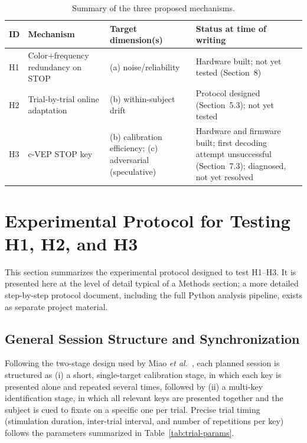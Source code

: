 \documentclass[11pt]{article}
\begin{document}
\begin{table}[htbp]
\centering
\caption{Summary of the three proposed mechanisms.}
\label{tab:h123-summary}
\small
\begin{tabular}{@{}p{1.0cm} p{4.5cm} p{2.6cm} p{4.1cm}@{}}
\toprule
\textbf{ID} & \textbf{Mechanism} & \textbf{Target dimension(s)} & \textbf{Status at time of writing} \\
\midrule
H1 & Color+frequency redundancy on STOP & (a) noise/reliability & Hardware built; not yet tested (Section~8) \\
H2 & Trial-by-trial online adaptation & (b) within-subject drift & Protocol designed (Section~5.3); not yet tested \\
H3 & c-VEP STOP key & (b) calibration efficiency; (c) adversarial (speculative) & Hardware and firmware built; first decoding attempt unsuccessful (Section~7.3); diagnosed, not yet resolved \\
\bottomrule
\end{tabular}
\end{table}


\section{Experimental Protocol for Testing H1, H2, and H3}

This section summarizes the experimental protocol designed to test H1--H3. It is presented here at the level of detail typical of a Methods section; a more detailed step-by-step protocol document, including the full Python analysis pipeline, exists as separate project material.

\subsection{General Session Structure and Synchronization}

Following the two-stage design used by Miao \textit{et al.}~\cite{miao2024cvepminimal}, each planned session is structured as (i) a short, single-target calibration stage, in which each key is presented alone and repeated several times, followed by (ii) a multi-key identification stage, in which all relevant keys are presented together and the subject is cued to fixate on a specific one per trial. Precise trial timing (stimulation duration, inter-trial interval, and number of repetitions per key) follows the parameters summarized in Table~\ref{tab:trial-params}.
\end{document}
